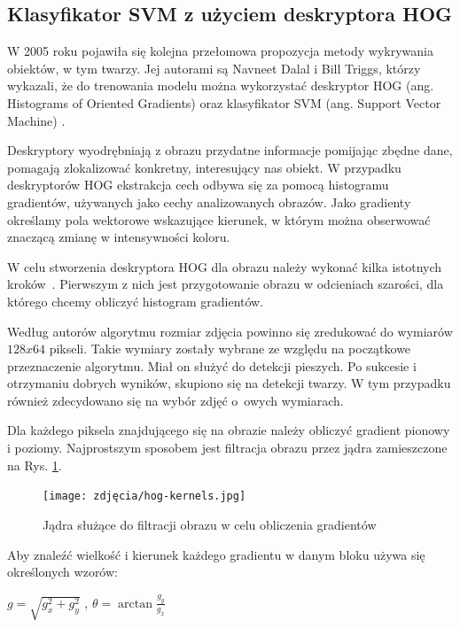 
\subsection{Klasyfikator SVM z użyciem deskryptora HOG}
\label{sec:svmhog}
W 2005 roku pojawiła się kolejna przełomowa propozycja metody wykrywania obiektów, w tym twarzy. Jej autorami są Navneet Dalal i Bill Triggs, którzy wykazali, że do trenowania modelu można wykorzystać deskryptor HOG (ang. Histograms of Oriented Gradients) oraz klasyfikator SVM (ang. Support Vector Machine) \cite{hog}. 

Deskryptory wyodrębniają z obrazu przydatne informacje pomijając zbędne dane, pomagają zlokalizować konkretny, interesujący nas obiekt. W przypadku deskryptorów HOG  ekstrakcja cech odbywa się za pomocą histogramu gradientów, używanych jako cechy analizowanych obrazów. Jako gradienty określamy pola wektorowe wskazujące kierunek, w którym można obserwować znaczącą zmianę w intensywności koloru.

W celu stworzenia deskryptora HOG dla obrazu należy wykonać kilka istotnych kroków~\cite{hog2}. Pierwszym z nich jest przygotowanie obrazu w odcieniach szarości, dla którego chcemy obliczyć histogram gradientów. 

Według autorów algorytmu rozmiar zdjęcia powinno się zredukować do wymiarów $128x64$ pikseli. Takie wymiary zostały wybrane ze względu na początkowe przeznaczenie algorytmu. Miał on służyć do detekcji pieszych. Po sukcesie i otrzymaniu dobrych wyników, skupiono się na detekcji twarzy. W tym przypadku również zdecydowano się na wybór zdjęć o~owych wymiarach.

Dla każdego piksela znajdującego się na obrazie należy obliczyć gradient pionowy i poziomy. Najprostszym sposobem jest filtracja obrazu przez jądra zamieszczone na Rys. \ref{fig:hogKernels}.

\begin{figure}[h]
	\centering
	\texttt{[image: zdjęcia/hog-kernels.jpg]}
	\caption{Jądra służące do filtracji obrazu w celu obliczenia gradientów \cite{hog2}} 
	\label{fig:hogKernels}
\end{figure}



Aby znaleźć wielkość i kierunek każdego gradientu w danym bloku używa się określonych wzorów:
\begin{center}
    $g=\sqrt{g_{x}^{2}+g_{y}^{2}}$ ,
    $\theta=\arctan \frac{g_{y}}{g_{x}}$
\end{center}

